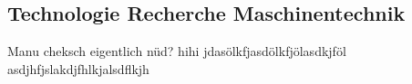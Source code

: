 \documentclass[../main.tex]{subfiles}
\begin{document}
\subsection{Technologie Recherche Maschinentechnik}
Manu cheksch eigentlich nüd?
hihi
jdasölkfjasdölkfjölasdkjföl
asdjhfjslakdjfhlkjalsdflkjh
\end{document}
